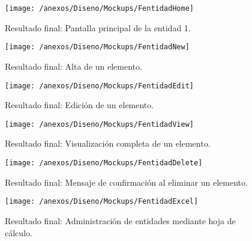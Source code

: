 \begin{figure}[h]
	\centering
	\texttt{[image: /anexos/Diseno/Mockups/FentidadHome]}
	\caption{Resultado final: Pantalla principal de la entidad 1.}
	\label{img:FentidadHome}
\end{figure}

\begin{figure}[h]
	\centering
	\texttt{[image: /anexos/Diseno/Mockups/FentidadNew]}
	\caption{Resultado final: Alta de un elemento.}
	\label{img:FentidadNew}
\end{figure}

\begin{figure}[h]
	\centering
	\texttt{[image: /anexos/Diseno/Mockups/FentidadEdit]}
	\caption{Resultado final: Edición de un elemento.}
	\label{img:FentidadEdit}
\end{figure}

\begin{figure}[h]
	\centering
	\texttt{[image: /anexos/Diseno/Mockups/FentidadView]}
	\caption{Resultado final: Visualización completa de un elemento.}
	\label{img:FentidadView}
\end{figure}

\begin{figure}[h]
	\centering
	\texttt{[image: /anexos/Diseno/Mockups/FentidadDelete]}
	\caption{Resultado final: Mensaje de confirmación al eliminar un elemento.}
	\label{img:FentidadDelete}
\end{figure}

\begin{figure}[h]
	\centering
	\texttt{[image: /anexos/Diseno/Mockups/FentidadExcel]}
	\caption{Resultado final: Administración de entidades mediante hoja de cálculo.}
	\label{img:FentidadExcel}
\end{figure}